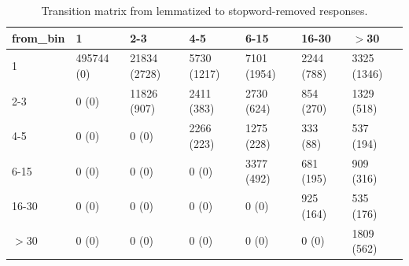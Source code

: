 \begin{table}[H]
\centering
\caption{Transition matrix from lemmatized to stopword-removed responses.} 
\label{tab:tab-3-4}
\begin{tabular}{lllllll}
  \hline
from\_bin & 1 & 2-3 & 4-5 & 6-15 & 16-30 & $>$30 \\ 
  \hline
1 & 495744 (0) & 21834 (2728) & 5730 (1217) & 7101 (1954) & 2244 (788) & 3325 (1346) \\ 
  2-3 & 0 (0) & 11826 (907) & 2411 (383) & 2730 (624) & 854 (270) & 1329 (518) \\ 
  4-5 & 0 (0) & 0 (0) & 2266 (223) & 1275 (228) & 333 (88) & 537 (194) \\ 
  6-15 & 0 (0) & 0 (0) & 0 (0) & 3377 (492) & 681 (195) & 909 (316) \\ 
  16-30 & 0 (0) & 0 (0) & 0 (0) & 0 (0) & 925 (164) & 535 (176) \\ 
  $>$30 & 0 (0) & 0 (0) & 0 (0) & 0 (0) & 0 (0) & 1809 (562) \\ 
   \hline
\end{tabular}
\end{table}

